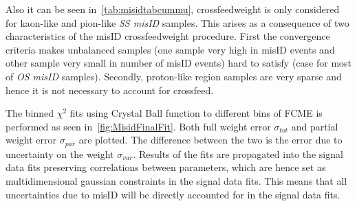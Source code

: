 Also it can be seen in~\autoref{tab:misidtabcummu}, crossfeedweight is only considered for kaon-like and pion-like \textit{SS misID} samples. This arises as a consequence of two characteristics of the misID crossfeedweight procedure. First the convergence criteria makes unbalanced samples (one sample very high in misID events and other sample very small in number of misID events) hard to satisfy (case for most of \textit{OS misID} samples). Secondly, proton-like region samples are very sparse and hence it is not necessary to account for crossfeed. %

The binned $\chi^{2}$ fits using Crystal Ball function to different bins of FCME is performed as seen in~\autoref{fig:MisidFinalFit}. Both full weight error $\sigma_{tot}$ and partial weight error $\sigma_{par}$ are plotted. The difference between the two is the error due to uncertainty on the weight $\sigma_{var}$.  Results of the fits are propagated into the signal data fits preserving correlations between parameters, which are hence set as multidimensional gaussian constraints in the signal data fits. This means that all uncertainties due to misID will be directly accounted for in the signal data fits.


